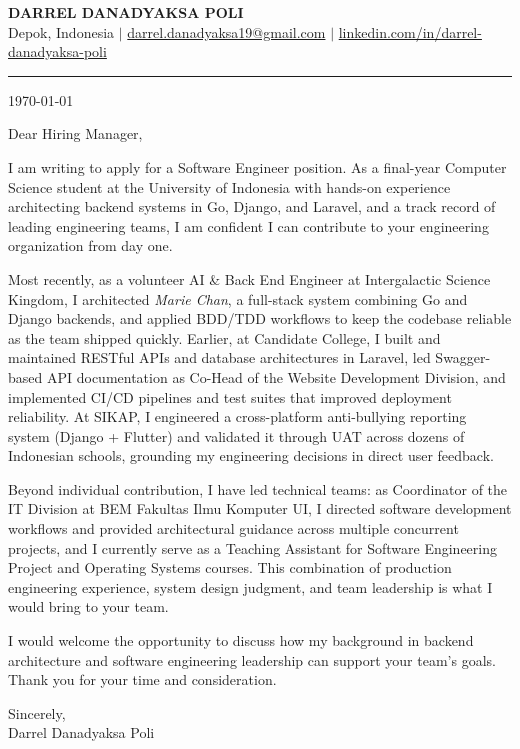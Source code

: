 \documentclass[letterpaper,11pt]{article}
\begin{document}
\begin{center}
    {\LARGE \bfseries DARREL DANADYAKSA POLI} \\[3pt]
    \small Depok, Indonesia \quad $|$ \quad
    \href{mailto:darrel.danadyaksa19@gmail.com}{darrel.danadyaksa19@gmail.com} \quad $|$ \quad
    \href{https://www.linkedin.com/in/darrel-danadyaksa-poli/}{linkedin.com/in/darrel-danadyaksa-poli}
\end{center}
\vspace{2pt}
\hrule
\vspace{14pt}

\today

\vspace{8pt}

Dear Hiring Manager,

I am writing to apply for a Software Engineer position. As a final-year Computer Science student at the University of Indonesia with hands-on experience architecting backend systems in Go, Django, and Laravel, and a track record of leading engineering teams, I am confident I can contribute to your engineering organization from day one.

Most recently, as a volunteer AI \& Back End Engineer at Intergalactic Science Kingdom, I architected \textit{Marie Chan}, a full-stack system combining Go and Django backends, and applied BDD/TDD workflows to keep the codebase reliable as the team shipped quickly. Earlier, at Candidate College, I built and maintained RESTful APIs and database architectures in Laravel, led Swagger-based API documentation as Co-Head of the Website Development Division, and implemented CI/CD pipelines and test suites that improved deployment reliability. At SIKAP, I engineered a cross-platform anti-bullying reporting system (Django + Flutter) and validated it through UAT across dozens of Indonesian schools, grounding my engineering decisions in direct user feedback.

Beyond individual contribution, I have led technical teams: as Coordinator of the IT Division at BEM Fakultas Ilmu Komputer UI, I directed software development workflows and provided architectural guidance across multiple concurrent projects, and I currently serve as a Teaching Assistant for Software Engineering Project and Operating Systems courses. This combination of production engineering experience, system design judgment, and team leadership is what I would bring to your team.

I would welcome the opportunity to discuss how my background in backend architecture and software engineering leadership can support your team's goals. Thank you for your time and consideration.

\vspace{10pt}

Sincerely, \\
Darrel Danadyaksa Poli
\end{document}
